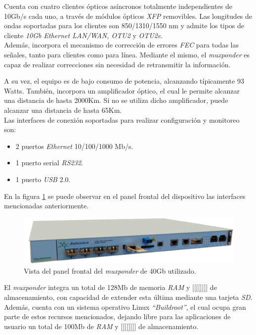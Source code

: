 Cuenta con cuatro clientes ópticos asíncronos totalmente independientes de 10Gb/s cada uno, a través de módulos ópticos  \textit{XFP} removibles. Las longitudes de ondas soportadas para los clientes son 850/1310/1550 nm y admite los tipos de cliente \textit{10Gb Ethernet LAN/WAN, OTU2} y \textit{OTU2e}.
\\

Además, incorpora el mecanismo de corrección de errores \textit{FEC} para todas las señales, tanto para clientes como para línea. Mediante el mismo, el \textit{muxponder} es capaz de realizar correcciones sin necesidad de retransmitir la información.

A su vez, el equipo es de bajo consumo de potencia, alcanzando típicamente 93 Watts. También, incorpora un amplificador óptico, el cual le permite alcanzar una distancia de hasta 2000Km. Si no se utiliza dicho amplificador, puede alcanzar una distancia de hasta 65Km.
\\

Las interfaces de conexión soportadas para realizar configuración y monitoreo son: 
\begin{itemize}
	\item 2 puertos \textit{Ethernet} 10/100/1000 Mb/s.
	\item 1 puerto serial \textit{RS232}.
	\item 1 puerto \textit{USB} 2.0.
\end{itemize}

En la figura \ref{fig:mux40} se puede observar en el panel frontal del dispositivo las interfaces mencionadas anteriormente.


\begin{figure}[H]
	\centering
	\includegraphics[scale=0.7]{Figures/mux40.pdf}
	\caption{Vista del panel frontal del \textit{muxponder} de 40Gb utilizado.}
	\label{fig:mux40}
  \end{figure}

El \textit{muxponder} integra un total de 128Mb de memoria \textit{RAM} y [[[[]]]] de almacenamiento, con capacidad de extender esta última mediante una tarjeta \textit{SD}. Además, cuenta con un sistema operativo Linux \textit{“Buildroot”}, el cual ocupa gran parte de estos recursos mencionados, dejando libre para las aplicaciones de usuario un total de 100Mb de \textit{RAM} y [[[[]]]] de almacenamiento.

